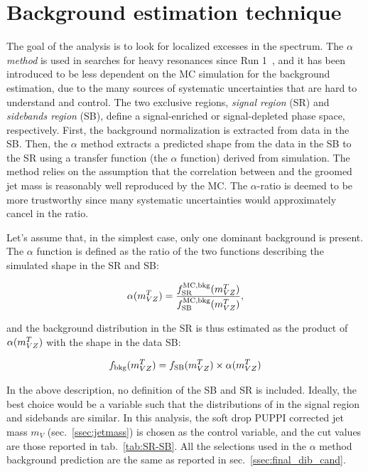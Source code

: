\section{Background estimation technique}
\label{sec:alpha}

The goal of the analysis is to look for localized excesses in the \mtVZ spectrum. The \emph{$\alpha$ method} is used in searches for heavy resonances since Run 1~\cite{Khachatryan:2015cwa}, and it has been introduced to be less dependent on the MC simulation for the background \mtVZ estimation, due to the many sources of systematic uncertainties that are hard to understand and control. The two exclusive regions, \emph{signal region} (SR) and \emph{sidebands region} (SB), define a signal-enriched or signal-depleted phase space, respectively. First, the background normalization is extracted from data in the SB. Then, the $\alpha$ method extracts a predicted shape from the data in the SB to the SR using a transfer function (the $\alpha$ function) derived from simulation. The method relies on the assumption that the correlation between \mtVZ and the groomed jet mass is reasonably well reproduced by the MC. The $\alpha$-ratio is deemed to be more trustworthy since many systematic uncertainties would approximately cancel in the ratio.

\noindent Let's assume that, in the simplest case, only one dominant background is present. The $\alpha$ function is defined as the ratio of the two functions describing the simulated \mtVZ shape in the SR and SB:

\begin{equation}
\alpha(m_{VZ}^T) = \frac{f_{\text{SR}}^{\text{MC,bkg}}(m_{VZ}^T)}{f_{\text{SB}}^{\text{MC,bkg}}(m_{VZ}^T)},
\end{equation}

\noindent and the background distribution in the SR is thus estimated as the product of  $\alpha(m_{VZ}^T)$ with the shape in the data SB:

\begin{equation}
f_{\text{bkg}}(m_{VZ}^T) = f_{\text{SB}}(m_{VZ}^T) \times \alpha(m_{VZ}^T)
\end{equation}

\noindent In the above description, no definition of the SB and SR is included. Ideally, the best choice would be a variable such that the distributions of \mtVZ in the signal region and sidebands are similar. In this analysis, the soft drop PUPPI corrected jet mass $m_V$ (sec.~\ref{ssec:jetmass}) is chosen as the control variable, and the cut values are those reported in tab.~\ref{tab:SR-SB}. All the selections used in the $\alpha$ method background prediction are the same as reported in sec.~\ref{ssec:final_dib_cand}.

